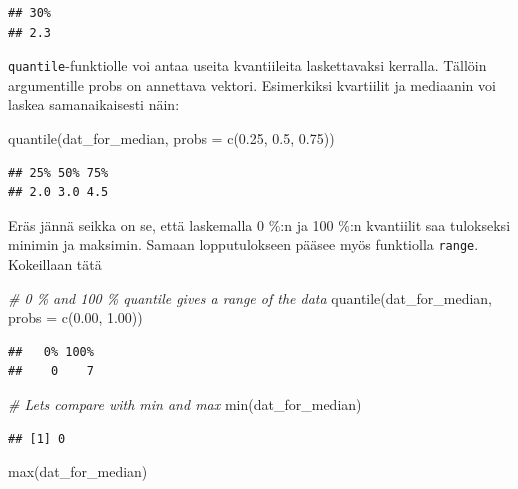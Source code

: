 \documentclass[
]{book}
\newenvironment{Shaded}{\begin{snugshade}}{\end{snugshade}}
\newcommand{\AttributeTok}[1]{\textcolor[rgb]{0.77,0.63,0.00}{#1}}
\newcommand{\CommentTok}[1]{\textcolor[rgb]{0.56,0.35,0.01}{\textit{#1}}}
\newcommand{\FloatTok}[1]{\textcolor[rgb]{0.00,0.00,0.81}{#1}}
\newcommand{\FunctionTok}[1]{\textcolor[rgb]{0.00,0.00,0.00}{#1}}
\newcommand{\NormalTok}[1]{#1}
\begin{document}
\begin{verbatim}
## 30% 
## 2.3
\end{verbatim}

\texttt{quantile}-funktiolle voi antaa useita kvantiileita laskettavaksi kerralla. Tällöin argumentille probs on annettava vektori. Esimerkiksi kvartiilit ja mediaanin voi laskea samanaikaisesti näin:

\begin{Shaded}
\begin{Highlighting}[]
\FunctionTok{quantile}\NormalTok{(dat\_for\_median, }\AttributeTok{probs =} \FunctionTok{c}\NormalTok{(}\FloatTok{0.25}\NormalTok{, }\FloatTok{0.5}\NormalTok{, }\FloatTok{0.75}\NormalTok{))}
\end{Highlighting}
\end{Shaded}

\begin{verbatim}
## 25% 50% 75% 
## 2.0 3.0 4.5
\end{verbatim}

Eräs jännä seikka on se, että laskemalla 0 \%:n ja 100 \%:n kvantiilit saa tulokseksi minimin ja maksimin. Samaan lopputulokseen pääsee myös funktiolla \texttt{range}. Kokeillaan tätä

\begin{Shaded}
\begin{Highlighting}[]
\CommentTok{\# 0 \% and 100 \% quantile gives a range of the data}
\FunctionTok{quantile}\NormalTok{(dat\_for\_median, }\AttributeTok{probs =} \FunctionTok{c}\NormalTok{(}\FloatTok{0.00}\NormalTok{, }\FloatTok{1.00}\NormalTok{))}
\end{Highlighting}
\end{Shaded}

\begin{verbatim}
##   0% 100% 
##    0    7
\end{verbatim}

\begin{Shaded}
\begin{Highlighting}[]
\CommentTok{\# Let\textquotesingle{}s compare with min and max}
\FunctionTok{min}\NormalTok{(dat\_for\_median)}
\end{Highlighting}
\end{Shaded}

\begin{verbatim}
## [1] 0
\end{verbatim}

\begin{Shaded}
\begin{Highlighting}[]
\FunctionTok{max}\NormalTok{(dat\_for\_median)}
\end{Highlighting}
\end{Shaded}
\end{document}
